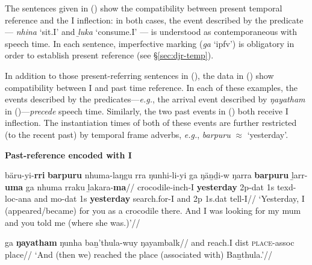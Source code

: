 The sentences given in () show the compatibility between present temporal reference and the \gls{I} inflection: in both cases, the event described by the predicate --- \textit{nhina} `sit.\gls{I}' and \textit{ḻuka} `consume.\gls{I}' --- is understood as contemporaneous with speech time. In each sentence, imperfective marking (\textit{ga} `\gls{ipfv}') is obligatory in order to establish present reference (see \S \ref{sec:djr-temp}).



In addition to those present-referring sentences in (), the data in () show compatibility between \gls{I} and past time reference. In each of these examples, the events described by the predicates---\textit{e.g.}, the arrival event described by \textit{ŋayatham} in ()---\textit{precede} speech time. Similarly, the two past events in () both receive \gls{I} inflection. The instantiation times of both of these events are further restricted (to the recent past) by temporal frame adverbs, \textit{e.g.}, \textit{barpuru} $\approx$ `yesterday'. %

\pex\textbf{Past-reference encoded with \gls{I}}


\a\begingl\gla bäru-yi-\textbf{rri} \textbf{barpuru} nhuma-laŋgu rra ŋunhi-li-yi ga ŋäṉḏi-w ŋarra \textbf{barpuru} ḻarr-\textbf{uma} ga nhuma rraku ḻakara-\textbf{ma}//
\glb crocodile-\gls{inch}-\gls{I} \textbf{yesterday} 2p-\gls{dat} 1s \gls{texd}-\gls{loc}-\gls{ana} and \gls{mo}-\gls{dat} 1s \textbf{yesterday} search.for-\gls{I} and 2p 1s.\gls{dat} tell-\gls{I}//
\glft`Yesterday, I (appeared/became) for you as a crocodile there. And I was looking for my mum and you told me (where she was.)'//\endgl

\a{}\begingl\gla ga \textbf{ŋayatham} ŋunha baṉ'thula-wuy ŋayambalk//
\glb and reach.\gls{I} \gls{dist} \textsc{place}-\gls{assoc} place//
\glft`And (then we) reached the place (associated with) Baṉthula.'//\endgl



